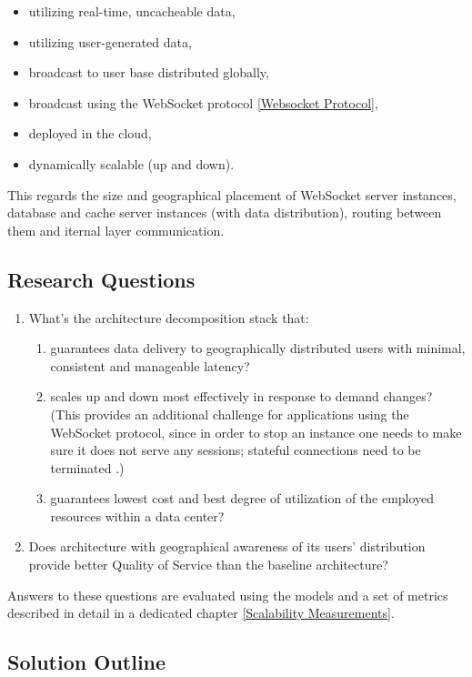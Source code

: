 \documentclass{uvamscse}
\begin{document}
\begin{itemize}
  \item utilizing real-time, uncacheable data,
  \item utilizing user-generated data,
  \item broadcast to user base distributed globally,
  \item broadcast using the WebSocket protocol \ref{Websocket Protocol},
  \item deployed in the cloud,
  \item dynamically scalable (up and down).
\end{itemize}

This regards the size and geographical placement of WebSocket server instances, database and cache server instances (with data distribution), routing between them and iternal layer communication.

\subsection{Research Questions}
\begin{enumerate}
  \item What's the architecture decomposition stack that:
    \begin{enumerate}
      \item guarantees data delivery to geographically distributed users with minimal, consistent and manageable latency?
      \item scales up and down most effectively in response to demand changes? (This provides an additional challenge for applications using the WebSocket protocol, since in order to stop an instance one needs to make sure it does not serve any sessions; stateful connections need to be terminated \cite{GroBuy}.)
      \item guarantees lowest cost and best degree of utilization of the employed resources within a data center?
    \end{enumerate}
  \item Does architecture with geographical awareness of its users' distribution provide better Quality of Service than the baseline architecture?
\end{enumerate}

Answers to these questions are evaluated using the models and a set of metrics described in detail in a dedicated chapter \ref{Scalability Measurements}.

\subsection{Solution Outline}
\end{document}
